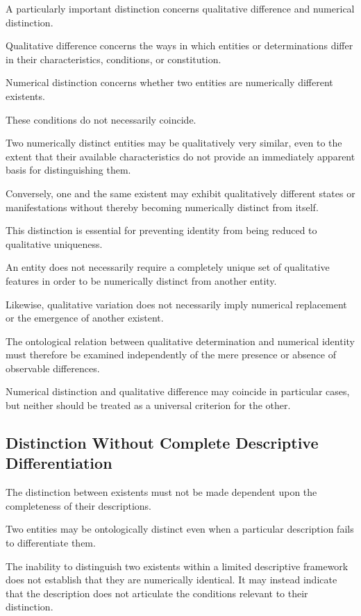 A particularly important distinction concerns
qualitative difference and numerical distinction.

Qualitative difference concerns the ways in
which entities or determinations differ in
their characteristics, conditions, or constitution.

Numerical distinction concerns whether two
entities are numerically different existents.

These conditions do not necessarily coincide.

Two numerically distinct entities may be
qualitatively very similar, even to the extent
that their available characteristics do not
provide an immediately apparent basis for
distinguishing them.

Conversely, one and the same existent may
exhibit qualitatively different states or
manifestations without thereby becoming
numerically distinct from itself.

This distinction is essential for preventing
identity from being reduced to qualitative
uniqueness.

An entity does not necessarily require a
completely unique set of qualitative features
in order to be numerically distinct from
another entity.

Likewise, qualitative variation does not
necessarily imply numerical replacement
or the emergence of another existent.

The ontological relation between qualitative
determination and numerical identity must
therefore be examined independently of the
mere presence or absence of observable
differences.

Numerical distinction and qualitative difference
may coincide in particular cases, but neither
should be treated as a universal criterion
for the other.

\subsection{Distinction Without Complete Descriptive Differentiation}

The distinction between existents must not
be made dependent upon the completeness
of their descriptions.

Two entities may be ontologically distinct
even when a particular description fails
to differentiate them.

The inability to distinguish two existents
within a limited descriptive framework does
not establish that they are numerically
identical. It may instead indicate that the
description does not articulate the conditions
relevant to their distinction.

